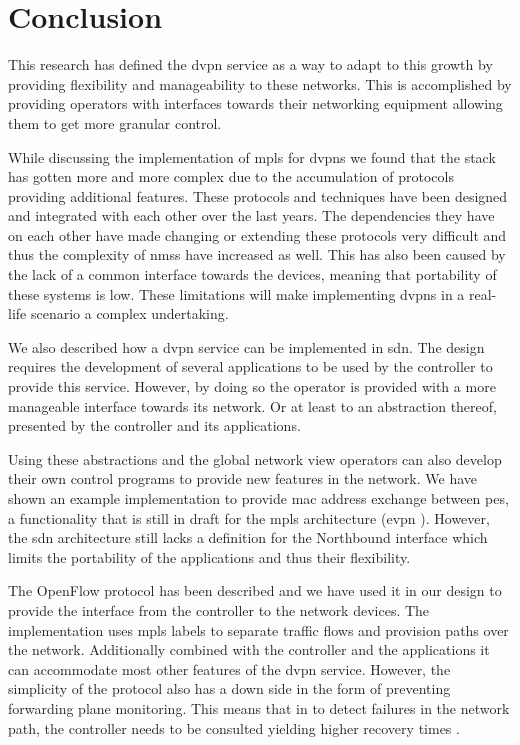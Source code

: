 \section{Conclusion} %
\label{sec:conclusion}

This research has defined the \ac{dvpn} service as a way to adapt to this growth by providing flexibility and manageability to these networks. This is accomplished by providing operators with interfaces towards their networking equipment allowing them to get more granular control.

While discussing the implementation of \ac{mpls} for \acp{dvpn} we found that the stack has gotten more and more complex due to the accumulation of protocols providing additional features. These protocols and techniques have been designed and integrated with each other over the last years. The dependencies they have on each other have made changing or extending these protocols very difficult and thus the complexity of \acp{nms} have increased as well. This has also been caused by the lack of a common interface towards the devices, meaning that portability of these systems is low. These limitations will make implementing \acp{dvpn} in a real-life scenario a complex undertaking.

We also described how a \ac{dvpn} service can be implemented in \ac{sdn}. The design requires the development of several applications to be used by the controller to provide this service. However, by doing so the operator is provided with a more manageable interface towards its network. Or at least to an abstraction thereof, presented by the controller and its applications. 

Using these abstractions and the global network view operators can also develop their own control programs to provide new features in the network. We have shown an example implementation to provide \ac{mac} address exchange between \acp{pe}, a functionality that is still in draft for the \ac{mpls} architecture (\ac{evpn} \cite{evpn}). However, the \ac{sdn} architecture still lacks a definition for the Northbound interface which limits the portability of the applications and thus their flexibility.

The OpenFlow protocol has been described and we have used it in our design to provide the interface from the controller to the network devices. The implementation uses \ac{mpls} labels to separate traffic flows and provision paths over the network. Additionally combined with the controller and the applications it can accommodate most other features of the \ac{dvpn} service. However, the simplicity of the protocol also has a down side in the form of preventing forwarding plane monitoring. This means that in to detect failures in the network path, the controller needs to be consulted yielding higher recovery times \cite{scalable-fault}.

